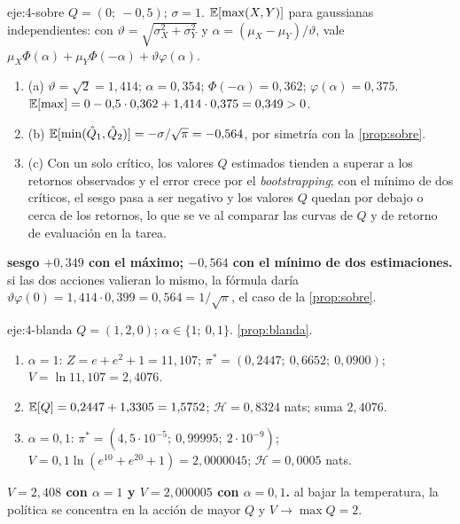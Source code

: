 \begin{solucion}{eje:4-sobre}
\datos $Q=(0;\ -0{,}5)$; $\sigma=1$.
\planteamiento $\mathbb{E}[\max(X,Y)]$ para gaussianas independientes: con $\vartheta=\sqrt{\sigma_X^{2}+\sigma_Y^{2}}$ y $\alpha=(\mu_X-\mu_Y)/\vartheta$, vale $\mu_X\Phi(\alpha)+\mu_Y\Phi(-\alpha)+\vartheta\varphi(\alpha)$.
\pasos
\begin{enumerate}[label=\arabic*.]
  \item (a) $\vartheta=\sqrt2=1{,}414$; $\alpha=0{,}354$; $\Phi(-\alpha)=0{,}362$; $\varphi(\alpha)=0{,}375$. $\mathbb{E}[\max]=0-0{,}5\cdot0{,}362+1{,}414\cdot0{,}375=0{,}349>0$.
  \item (b) $\mathbb{E}[\min(\hat Q_1,\hat Q_2)]=-\sigma/\sqrt\pi=-0{,}564$, por simetría con la \cref{prop:sobre}.
  \item (c) Con un solo crítico, los valores $Q$ estimados tienden a superar a los retornos observados y el error crece por el \emph{bootstrapping}; con el mínimo de dos críticos, el sesgo pasa a ser negativo y los valores $Q$ quedan por debajo o cerca de los retornos, lo que se ve al comparar las curvas de $Q$ y de retorno de evaluación en la tarea.
\end{enumerate}
\resultado \textbf{sesgo $+0{,}349$ con el máximo; $-0{,}564$ con el mínimo de dos estimaciones.}
\comprobacion si las dos acciones valieran lo mismo, la fórmula daría $\vartheta\varphi(0)=1{,}414\cdot0{,}399=0{,}564=1/\sqrt\pi$, el caso de la \cref{prop:sobre}.
\end{solucion}

\begin{solucion}{eje:4-blanda}
\datos $Q=(1,2,0)$; $\alpha\in\{1;\ 0{,}1\}$.
\planteamiento \cref{prop:blanda}.
\pasos
\begin{enumerate}[label=\arabic*.]
  \item $\alpha=1$: $Z=e+e^{2}+1=11{,}107$; $\pi^{*}=(0{,}2447;\ 0{,}6652;\ 0{,}0900)$; $V=\ln11{,}107=2{,}4076$.
  \item $\mathbb{E}[Q]=0{,}2447+1{,}3305=1{,}5752$; $\mathcal H=0{,}8324$ nats; suma $2{,}4076$.
  \item $\alpha=0{,}1$: $\pi^{*}=(4{,}5\cdot10^{-5};\ 0{,}99995;\ 2\cdot10^{-9})$; $V=0{,}1\ln(e^{10}+e^{20}+1)=2{,}0000045$; $\mathcal H=0{,}0005$ nats.
\end{enumerate}
\resultado \textbf{$V=2{,}408$ con $\alpha=1$ y $V=2{,}000005$ con $\alpha=0{,}1$.}
\comprobacion al bajar la temperatura, la política se concentra en la acción de mayor $Q$ y $V\to\max Q=2$.
\end{solucion}

